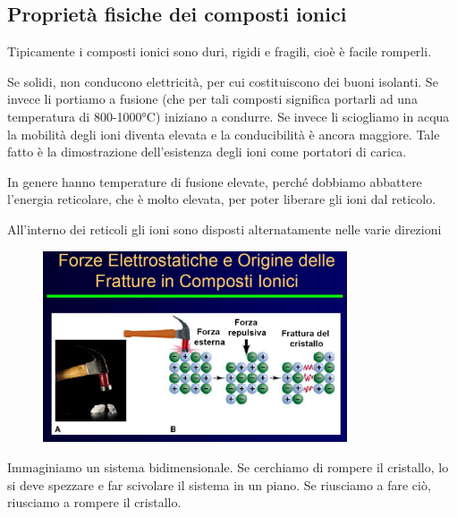\subsection{Proprietà fisiche dei composti ionici}
Tipicamente i composti ionici sono duri, rigidi e fragili, cioè è facile romperli.

Se solidi, non conducono elettricità, per cui costituiscono dei buoni isolanti. Se invece li portiamo a fusione (che per tali composti significa portarli ad una temperatura di 800-1000°C) iniziano a condurre. Se invece li sciogliamo in acqua la mobilità degli ioni diventa elevata e la conducibilità è ancora maggiore. Tale fatto è la dimostrazione dell'esistenza degli ioni come portatori di carica.

In genere hanno temperature di fusione elevate, perché dobbiamo abbattere l'energia reticolare, che è molto elevata, per poter liberare gli ioni dal reticolo.

All'interno dei reticoli gli ioni sono disposti alternatamente nelle varie direzioni
\begin{figure}[htp]
    \centering
    \includegraphics[width=9cm]{immagini/struttura-composti-ionici.png}
\end{figure}

Immaginiamo un sistema bidimensionale. Se cerchiamo di rompere il cristallo, lo si deve spezzare e far scivolare il sistema in un piano. Se riusciamo a fare ciò, riusciamo a rompere il cristallo.